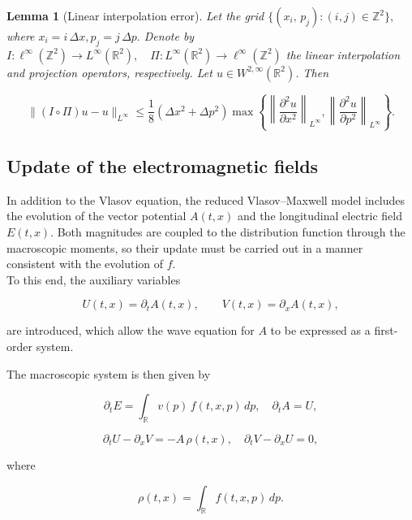 \documentclass[11pt,a4paper,twoside,pdf]{article}
\numberwithin{equation}{section}
\newtheorem{lemma}[theorem]{Lemma}
\begin{document}
\begin{lemma}[Linear interpolation error]

Let the grid $\{(x_i,\, p_j) : (i,j)\in \mathbb{Z}^2\},$ where $x_i = i\,\Delta x, p_j = j\,\Delta p.$ Denote by $I : \ell^\infty(\mathbb{Z}^2) \longrightarrow L^\infty(\mathbb{R}^2),
\quad
\Pi : L^\infty(\mathbb{R}^2) \longrightarrow \ell^\infty(\mathbb{Z}^2)$ the linear interpolation and projection operators, respectively. Let $u\in W^{2,\infty}(\mathbb{R}^2)$. Then


\[
\|(I\circ\Pi)u - u\|_{L^\infty}
\le \frac{1}{8}(\Delta x^2 + \Delta p^2)
\max\left\{
\left\|\frac{\partial^2 u}{\partial x^2}\right\|_{L^\infty},
\left\|\frac{\partial^2 u}{\partial p^2}\right\|_{L^\infty}
\right\}.
\]



\end{lemma}





\subsection{Update of the electromagnetic fields}

In addition to the Vlasov equation, the reduced Vlasov--Maxwell model includes the
evolution of the vector potential $A(t,x)$ and the longitudinal electric field $E(t,x)$.
Both magnitudes are coupled to the distribution function through the
macroscopic moments, so their update must be carried out in a manner
consistent with the evolution of $f$. \\

To this end, the auxiliary variables


\[
U(t,x)=\partial_t A(t,x), \qquad V(t,x)=\partial_x A(t,x),
\]


are introduced, which allow the wave equation for $A$ to be expressed as a first-order
system.

The macroscopic system is then given by


\[
\partial_t E = \int_{\mathbb{R}} v(p)\,f(t,x,p)\,dp, \quad \partial_t A = U,
\]




\[
\partial_t U - \partial_x V = -A\,\rho(t,x), \quad
\partial_t V - \partial_x U = 0,
\]


where


\[
\rho(t,x)=\int_{\mathbb{R}} f(t,x,p)\,dp.
\]
\end{document}

